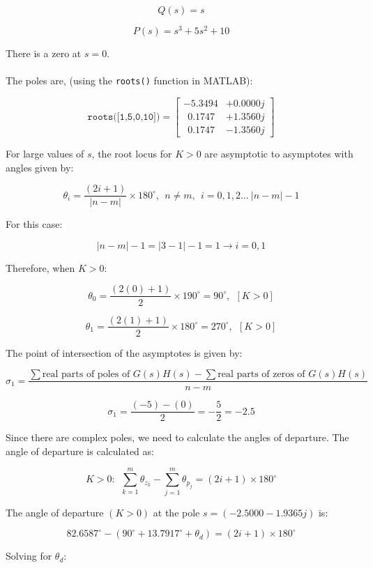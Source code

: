\documentclass[12pt, letterpaper]{../assignment}
\begin{document}
$$ Q(s) = s $$

$$ P(s) = s^3 + 5 s^2 + 10 $$

There is a zero at $s=0$.
\\\\
The poles are, (using the \texttt{roots()} function in MATLAB):

$$ \texttt{roots([1,5,0,10])} = \left[ \begin{array}{cc} 
    -5.3494 &+ 0.0000j\\
 \ \ 0.1747 &+ 1.3560j\\
 \ \ 0.1747 &- 1.3560j
\end{array} \right] $$

For large values of $s$, the root locus for $K > 0$ are asymptotic to asymptotes with angles
given by:

$$ \theta_i = \frac{(2i+1)}{|n-m|} \times 180^{\circ}, \ \ n \neq m, \ \ i = 0,1,2... \ |n-m|-1$$

For this case:

$$ |n-m|-1 = |3-1|-1 = 1 \rightarrow i = 0,1 $$

Therefore, when $K > 0$:
\begin{answer}
    $$ \theta_0 = \frac{(2(0)+1)}{2} \times 190^{\circ} = 90^{\circ}, \ \ [K > 0] $$
\end{answer}


\begin{answer}
    $$ \theta_1 = \frac{(2(1)+1)}{2} \times 180^{\circ} = 270^{\circ}, \ \ [K > 0] $$
\end{answer}



The point of intersection of the asymptotes is given by:

$$ \sigma_1 = \frac{\sum \text{real parts of poles of } G(s)H(s) - \sum \text{real parts of zeros of } G(s)H(s) }{n-m} $$

$$ \sigma_1 = \frac{(-5) - (0) }{2} = -\frac{5}{2} = -2.5 $$

Since there are complex poles, we need to calculate the angles of departure. The angle of departure is calculated as:

$$ K > 0:  \ \ \sum^m_{k = 1}\theta_{z_k} - \sum^m_{j = 1}\theta_{p_j} = (2i+1)\times 180^{\circ} $$

The angle of departure $(K > 0)$ at the pole $s = (-2.5000 - 1.9365j)$ is:

$$ 82.6587^{\circ} - (90^{\circ} + 13.7917^{\circ} + \theta_d) = (2i+1)\times 180^{\circ} $$

Solving for $\theta_d$:
\end{document}
